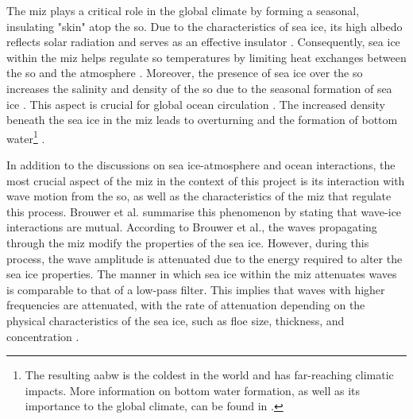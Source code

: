 The \acs{miz} plays a critical role in the global climate by forming a seasonal, insulating "skin" atop the \acs{so}. Due to the characteristics of sea ice, its high albedo reflects solar radiation and serves as an effective insulator \cite{Parkinson2004, Massom2010}. Consequently, sea ice within the \acs{miz} helps regulate \acs{so} temperatures by limiting heat exchanges between the \acs{so} and the atmosphere \cite{Parkinson2004}. Moreover, the presence of sea ice over the \acs{so} increases the salinity and density of the \acs{so} due to the seasonal formation of sea ice \cite{Massom2010, Parkinson2004}. This aspect is crucial for global ocean circulation \cite{Thomas2017Chap8}. The increased density beneath the sea ice in the \acs{miz} leads to overturning and the formation of bottom water\footnote{The resulting \ac{aabw} is the coldest in the world and has far-reaching climatic impacts. More information on bottom water formation, as well as its importance to the global climate, can be found in \cite{Gordon2001,Thomas2017Chap8,Jacobs2004}.} \cite{Parkinson2004}.


In addition to the discussions on sea ice-atmosphere and ocean interactions, the most crucial aspect of the \acs{miz} in the context of this project is its interaction with wave motion from the \acs{so}, as well as the characteristics of the \acs{miz} that regulate this process. Brouwer et al. \cite{Brouwer2022} summarise this phenomenon by stating that wave-ice interactions are mutual. According to Brouwer et al., the waves propagating through the \acs{miz} modify the properties of the sea ice. However, during this process, the wave amplitude is attenuated due to the energy required to alter the sea ice properties. The manner in which sea ice within the \acs{miz} attenuates waves is comparable to that of a low-pass filter. This implies that waves with higher frequencies are attenuated, with the rate of attenuation depending on the physical characteristics of the sea ice, such as floe size, thickness, and concentration \cite{Squire2020, Montiel2022}.

